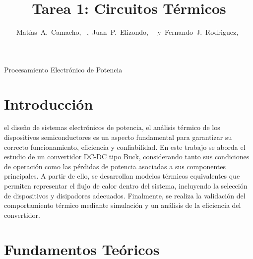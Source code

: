 \documentclass[journal]{IEEEtran}
\begin{document}
%
\title{Tarea 1: Circuitos Térmicos}


\author{Matías~A.~Camacho,~
        ,~Juan~P.~Elizondo,~
        ~y~Fernando~J.~Rodriguez,~
}


%
{Procesamiento Electrónico de Potencia}


\maketitle


\section{Introducción}

 el diseño de sistemas electrónicos de potencia, el análisis térmico de los dispositivos semiconductores 
es un aspecto fundamental para garantizar su correcto funcionamiento, eficiencia y confiabilidad. En este trabajo se aborda el 
estudio de un convertidor DC-DC tipo Buck, considerando tanto sus condiciones de operación como las pérdidas de potencia asociadas 
a sus componentes principales. A partir de ello, se desarrollan modelos térmicos equivalentes que permiten representar el flujo de 
calor dentro del sistema, incluyendo la selección de dispositivos y disipadores adecuados. Finalmente, se realiza la validación del 
comportamiento térmico mediante simulación y un análisis de la eficiencia del convertidor.


\section{Fundamentos Teóricos}
\end{document}
